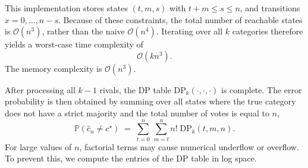 This implementation stores states $(t,m,s)$ with $t+m\leq s\leq n$, and transitions $x=0, \dots, n-s$. 
Because of these constraints, the total number of reachable states is $\mathcal{O}(n^{3})$, rather than the naive $\mathcal{O}(n^{4})$. Iterating over all $k$ categories therefore yields a worst-case time complexity of
$$\mathcal{O}(kn^{3}).$$
The memory complexity is $\mathcal{O}(n^{3})$.

After processing all $k-1$ rivals, the DP table $\text{DP}_{k}(\cdot,\cdot,\cdot)$ is complete.
The error probability is then obtained by summing over all states where the true category does not have a strict majority and the total number of votes is equal to $n$, 
$$
  \mathbb{P}(\hat{c}_n \neq c^\star)
  \;=\;
  \sum_{t=0}^{n}\,
  \sum_{m=t}^{n}
  n!\;\text{DP}_{k}(t,m,n).
$$
For large values of $n$, factorial terms may cause numerical underflow or overflow. To prevent this, we compute the entries of the DP table in log space.